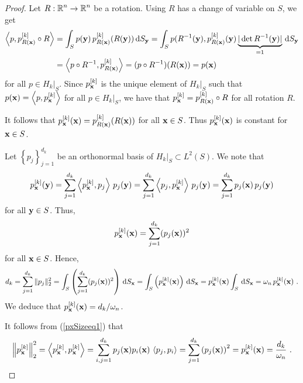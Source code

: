 \begin{proof}
 Let $\displaystyle R:\mathbb{R}^n \to \mathbb{R}^n$ be a rotation.  Using
$R$ has a change of variable on $S$, we get
\begin{align*}
\left\langle{p} , {p_{R(\mathbf{x})}^{[k]}\circ R}\right\rangle
&= \int_S p(\mathbf{y})\, p_{R(\mathbf{x})}^{[k]}(R(\mathbf{y})) \,\mathrm{d}{S}_{\mathbf{y}}  
= \int_S p(R^{-1}(\mathbf{y}), p_{R(\mathbf{x})}^{[k]}(\mathbf{y})
\underbrace{|\det R^{-1}(\mathbf{y})|}_{=1} \,\mathrm{d}{S}_{\mathbf{y}} \\
&= \left\langle{p\circ R^{-1}} , {p_{R(\mathbf{x})}^{[k]}}\right\rangle
= (p\circ R^{-1})(R(\mathbf{x})) = p(\mathbf{x})
\end{align*}
for all $\displaystyle p \in H_k\big|_S$.  Since
$\displaystyle p_{\mathbf{x}}^{[k]}$ is the
unique element of $H_k\big|_S$ such that
$\displaystyle p(\mathbf{x}) = \left\langle{p} , {p_{\mathbf{x}}^{[k]}}\right\rangle$ for all
$\displaystyle p \in H_k\big|_S$, we have that
$\displaystyle p_{\mathbf{x}}^{[k]} = p_{R(\mathbf{x})}^{[k]}\circ R$ for
all rotation $R$.

It follows that
$\displaystyle p_{\mathbf{x}}^{[k]}(\mathbf{x}) = p_{R(\mathbf{x})}^{[k]}(R(\mathbf{x}))$
for all $\mathbf{x} \in S$.  Thus
$\displaystyle p_{\mathbf{x}}^{[k]}(\mathbf{x})$ is constant for
$\mathbf{x} \in S$.

Let $\displaystyle \left\{ p_j\right\}_{j=1}^{d_k}$ be an orthonormal basis of
$\displaystyle H_k\big|_S \subset L^2(S)$.  We note that
\begin{equation} \label{pxSizeeq1}
p_{\mathbf{x}}^{[k]}(\mathbf{y})
= \sum_{j=1}^{d_k} \left\langle{p_{\mathbf{x}}^{[k]}} , {p_j}\right\rangle\, p_j(\mathbf{y})
= \sum_{j=1}^{d_k} \left\langle{p_j} , {p_{\mathbf{x}}^{[k]}}\right\rangle\, p_j(\mathbf{y})
= \sum_{j=1}^{d_k} p_j(\mathbf{x}) \, p_j(\mathbf{y})
\end{equation}
for all $\mathbf{y} \in S$.  Thus,
\[
p_{\mathbf{x}}^{[k]}(\mathbf{x}) = \sum_{j=1}^{d_k} (p_j(\mathbf{x}))^2
\]
for all $\mathbf{x} \in S$.  Hence,
\[
d_k = \sum_{j=1}^{d_k} \|p_j\|_2^2
= \int_S \left( \sum_{j=1}^{d_k} (p_j(\mathbf{x}))^2 \right) \,\mathrm{d}{S}_{\mathbf{x}} 
= \int_S \left( p_{\mathbf{x}}^{[k]}(\mathbf{x}) \right) \,\mathrm{d}{S}_{\mathbf{x}}
= p_{\mathbf{x}}^{[k]}(\mathbf{x}) \int_S \,\mathrm{d}{S}_{\mathbf{x}} 
= \omega_n\, p_{\mathbf{x}}^{[k]}(\mathbf{x}) \ .
\]
We deduce that
$\displaystyle p_{\mathbf{x}}^{[k]}(\mathbf{x}) = d_k/\omega_n$.

 It follows from (\ref{pxSizeeq1}) that
\[
\left\|p_{\mathbf{x}}^{[k]}\right\|_2^2 = \left\langle{p_{\mathbf{x}}^{[k]}} , {p_{\mathbf{x}}^{[k]}}\right\rangle
= \sum_{i,j=1}^{d_k} p_j(\mathbf{x}) p_i(\mathbf{x}) \, \left\langle{p_j} , {p_i}\right\rangle
= \sum_{j=1}^{d_k} \left(p_j(\mathbf{x})\right)^2 = p_{\mathbf{x}}^{[k]}(\mathbf{x})
= \frac{d_k}{\omega_n} \ .
\]


\end{proof}
